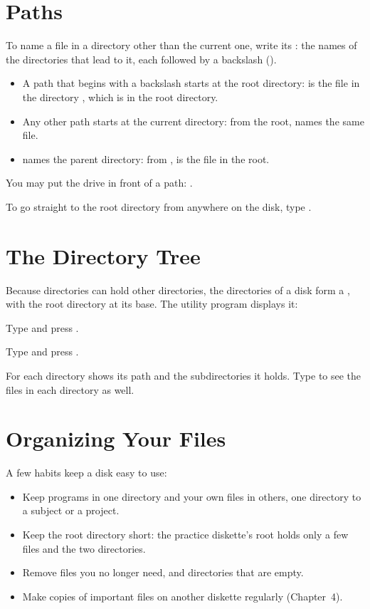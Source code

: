 
\section{Paths}
To name a file in a directory other than the current one, write its
: the names of the directories that lead to it, each followed by
a backslash (\type{\bs}).
\begin{itemize}
\item A path that begins with a backslash starts at the root directory:
   is the file  in the
  directory , which is in the root directory.
\item Any other path starts at the current directory: from the root,
   names the same file.
\item {} names the parent directory: from ,
   is the file  in the root.
\end{itemize}
You may put the drive in front of a path: .

To go straight to the root directory from anywhere on the disk, type
.

\section{The Directory Tree}
Because directories can hold other directories, the directories of a disk
form a , with the root directory at its base.  The 
utility program displays it:
\begin{Steps}
\item Type  and press .
\item Type  and press .
\end{Steps}


For each directory  shows its path and the subdirectories it
holds.  Type  to see the files in each directory as well.

\section{Organizing Your Files}
A few habits keep a disk easy to use:
\begin{itemize}
\item Keep programs in one directory and your own files in others, one
  directory to a subject or a project.
\item Keep the root directory short: the practice diskette's root holds
  only a few files and the two directories.
\item Remove files you no longer need, and directories that are empty.
\item Make copies of important files on another diskette regularly
  (Chapter~4).
\end{itemize}
